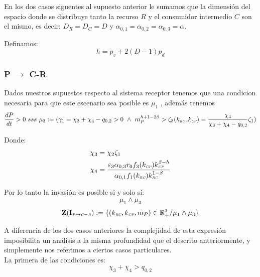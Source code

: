 En los dos casos siguentes al supuesto anterior le sumamos que la dimensi\'on del espacio donde se distribuye tanto la recurso $R$ y el consumidor intermedio $C$ son el mismo, es decir: $D_R = D_C = D$ y $\alpha_{0,1} = \alpha_{0,2} = \alpha_{0,3} = \alpha$.

Definamos:
\begin{equation}
  h = p_v + 2(D-1)p_d
\end{equation}

\subsubsection{P $\to$ C-R}
Dados nuestros supuestos respecto al sistema receptor tenemos que una condicion necesaria para que este escenario sea posible es $\mu_1$ , adem\'as tenemos
\begin{equation}
  \frac{dP}{dt}  >0 \ sss \  \mu_3 := (\gamma_1 = \chi_3 + \chi_4 - q_{0,2} >0 \ \land \ m_P^{h + 1 - 2\beta} > \zeta_3(k_{\textit{\tiny RC}},k_{\textit{\tiny CP}}) = \frac{\chi_4}{\chi_3 + \chi_4 - q_{0,2}}\zeta_1)
\end{equation}

Donde:
\begin{equation}\label{eq:3rdCond}
  \begin{aligned}
    \chi_3 &= \chi_2 \zeta_1 \\
    \chi_4 &= \frac{\varepsilon_3 \alpha_{0,3}r_0 f_3(k_{\textit{\tiny CP}})k_{\textit{\tiny CP}}^{\beta - h}}{\alpha_{0,1}f_1(k_{\textit{\tiny RC}})k_{\textit{\tiny RC}}^{1-\beta}}
  \end{aligned}
\end{equation}

Por lo tanto la invasi\'on es posible si y solo s\'i:
\begin{equation}
  \mu_1 \land \mu_3
\end{equation}
\begin{equation}
\mathbf{Z(I_{\textit{\tiny P} \to \textit{\tiny C}-\textit{\tiny R}})} := \{ (k_{\textit{\tiny RC}},k_{\textit{\tiny CP}},m_P) \in \mathbb{R}^3_+ / \mu_1 \land \mu_3 \}
\end{equation}

A diferencia de los dos casos anteriores la complejidad de esta expresi\'on imposibilita un an\'alisis a la misma profundidad que el descrito anteriormente, y simplemente nos referimos a ciertos casos particulares.\\

La primera de las condiciones es:
\begin{equation}
  \chi_3 + \chi_4 > q_{0,2}
\end{equation}

